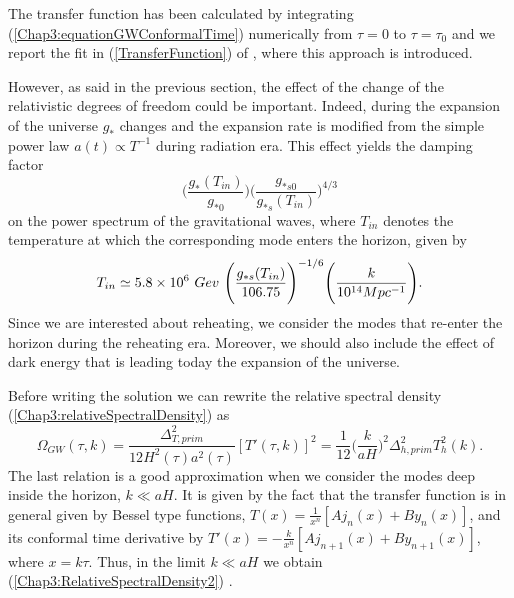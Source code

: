 \documentclass[11pt,a4paper,twoside]{book}
\begin{document}
The transfer function has been calculated by integrating (\ref{Chap3:equationGWConformalTime}) numerically from $ \tau=0 $ to $ \tau=\tau_{0} $ and we report the fit in (\ref{TransferFunction}) of \cite{Chap3:GW_Turner_White}, where this approach is introduced. 

However, as said in the previous section, the effect of the change of the relativistic degrees of freedom could be important. Indeed, during the expansion of the universe $ g_{*} $ changes and the expansion rate is modified from the simple power law $ a(t) \propto T^{-1} $ during radiation era. This effect yields the damping factor 
\begin{equation}
	\label{Chap3:dampingFactorDOF}
	\Bigg (\frac{g_{*}(T_{in})}{g_{*0}} \Bigg)\Bigg (\frac{g_{*s0}}{g_{*s}(T_{in})}\Bigg)^{4/3}
\end{equation}
on the power spectrum of the gravitational waves, where $ T_{in} $ denotes the temperature at which the corresponding mode enters the horizon, given by \cite{Chap3:ProibingReheatingTemperature2008}
\begin{equation}
	\label{T_{in}}
	T_{in} \simeq 5.8 \times 10^{6}\ Gev\ \Bigg (\frac{g_{*s}(T_{in})}{106.75}\Bigg)^{-1/6} \Bigg (\frac{k}{10^{14}Mpc^{-1}} \Bigg).
\end{equation}
Since we are interested about reheating, we consider the modes that re-enter the horizon during the reheating era. Moreover, we should also include the effect of dark energy that is leading today the expansion of the universe. 

 Before writing the solution we can rewrite the relative spectral density (\ref{Chap3:relativeSpectralDensity}) as
\begin{equation}
	\label{Chap3:RelativeSpectralDensity2}
	\Omega_{GW}(\tau,k) = \frac{\Delta_{T,prim}^{2}}{12H^{2}(\tau)a^{2}(\tau)}[T'(\tau,k)]^{2} = \frac{1}{12}\Bigg (\frac{k}{aH}\Bigg)^{2}\Delta_{h,prim}^{2}T^{2}_{h}(k).
\end{equation}
The last relation is a good approximation when we consider the modes deep inside the horizon, $ k \ll aH $. It is given by the fact  that the transfer function  is in general given by Bessel type functions, $ T(x) = \frac{1}{x^{n}}[Aj_{n}(x) + By_{n}(x)] $, and its conformal time derivative by $ T'(x) = -\frac{k}{x^{n}}[Aj_{n+1}(x) + By_{n+1}(x)] $, where $ x=k\tau $. Thus, in the limit $ k\ll aH $ we obtain (\ref{Chap3:RelativeSpectralDensity2}) \cite{Chap3:GW_Watanabe_Komatsu}.
\end{document}
